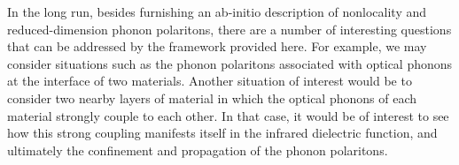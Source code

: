\documentclass[superscriptaddress,reprint,prb]{revtex4-1}
\begin{document}
In the long run, besides furnishing an ab-initio description of nonlocality and reduced-dimension phonon polaritons, there are a number of interesting questions that can be addressed by the framework provided here. For example, we may consider situations such as the phonon polaritons associated with optical phonons at the interface of two materials. Another situation of interest would be to consider two nearby layers of material in which the optical phonons of each material strongly couple to each other. In that case, it would be of interest to see how this strong coupling manifests itself in the infrared dielectric function, and ultimately the confinement and propagation of the phonon polaritons.








\end{document}
